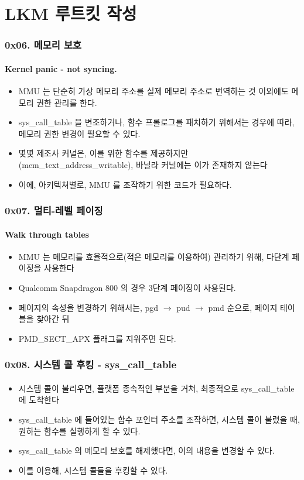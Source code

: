 \section[Section]{LKM 루트킷 작성}
\begin{frame}
  \frametitle{0x06. 메모리 보호}
  \framesubtitle{Kernel panic - not syncing.}

  \begin{itemize}
  \item <1-> MMU 는 단순히 가상 메모리 주소를 실제 메모리 주소로 번역하는 것 이외에도 메모리 권한 관리를 한다.
  \item <2-> sys\_call\_table 을 변조하거나, 함수 프롤로그를 패치하기 위해서는 경우에 따라, 메모리 권한 변경이 필요할 수 있다.
  \item <3-> 몇몇 제조사 커널은, 이를 위한 함수를 제공하지만 (mem\_text\_address\_writable), 바닐라 커널에는 이가 존재하지 않는다
  \item <4-> 이에, 아키텍쳐별로, MMU 를 조작하기 위한 코드가 필요하다.
  \end{itemize}
\end{frame}

\begin{frame}
  \frametitle{0x07. 멀티-레벨 페이징}
  \framesubtitle{Walk through tables}

  \begin{itemize}
  \item <1-> MMU 는 메모리를 효율적으로(적은 메모리를 이용하여) 관리하기 위해, 다단계 페이징을 사용한다
  \item <2-> Qualcomm Snapdragon 800 의 경우 3단계 페이징이 사용된다.
  \item <3-> 페이지의 속성을 변경하기 위해서는, pgd $\rightarrow$ pud $\rightarrow$ pmd 순으로, 페이지 테이블을 찾아간 뒤
  \item <4-> PMD\_SECT\_APX 플래그를 지워주면 된다.
  \end{itemize}
\end{frame}

\begin{frame}
  \frametitle{0x08. 시스템 콜 후킹 - sys\_call\_table}
  \framesubtitle{}

  \begin{itemize}
  \item <1-> 시스템 콜이 불리우면, 플랫폼 종속적인 부분을 거쳐, 최종적으로 sys\_call\_table 에 도착한다
  \item <2-> sys\_call\_table 에 들어있는 함수 포인터 주소를 조작하면, 시스템 콜이 불렸을 때, 원하는 함수를 실행하게 할 수 있다.
  \item <3-> sys\_call\_table 의 메모리 보호를 해제했다면, 이의 내용을 변경할 수 있다.
  \item <4-> 이를 이용해, 시스템 콜들을 후킹할 수 있다.
  \end{itemize}
\end{frame}


